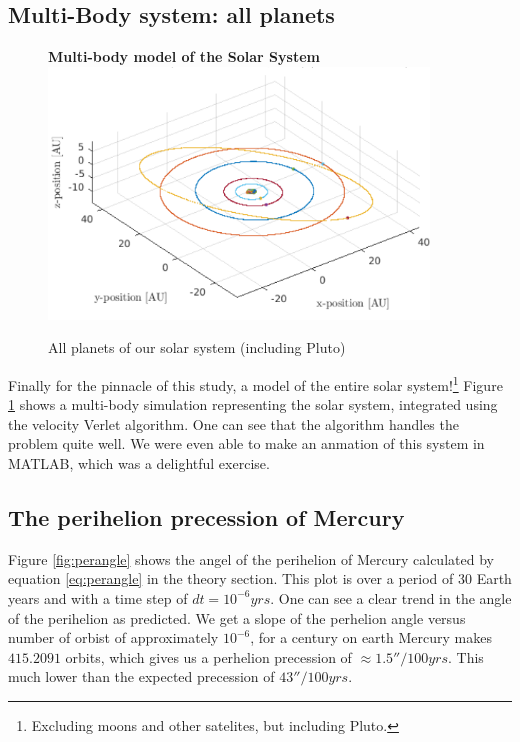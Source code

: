 \documentclass[10pt,a4paper]{amsart}
\begin{document}
\subsection{Multi-Body system: all planets}

\begin{figure}
	\centering
	\textbf{Multi-body model of the Solar System}
	\includegraphics[width=0.9\textwidth]{../figures/multibody.png}
	\caption{All planets of our solar system (including Pluto) \label{fig:multibody}}
\end{figure}

Finally for the pinnacle of this study, a model of the entire solar system!\footnote{Excluding moons and other satelites, but including Pluto.} Figure \ref{fig:multibody} shows a multi-body simulation representing the solar system, integrated using the velocity Verlet algorithm. One can see that the algorithm handles the problem quite well. We were even able to make an anmation of this system in MATLAB, which was a delightful exercise.

\subsection{The perihelion precession of Mercury}

Figure \ref{fig:perangle} shows the angel of the perihelion of Mercury calculated by equation \ref{eq:perangle} in the theory section. This plot is over a period of 30 Earth years and with a time step of $dt = 10^{-6}yrs$. One can see a clear trend in the angle of the perihelion as predicted. We get a slope of the perhelion angle versus number of orbist of approximately $10^{-6}$, for a century on earth Mercury makes $415.2091$ orbits, which gives us a perhelion precession of $\approx1.5''/100yrs$. This much lower than the expected precession of $43''/100yrs$.
\end{document}
